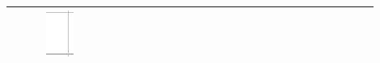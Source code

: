 \documentclass[10pt]{article}
\begin{document}
\begin{center}
\begin{tabular}{|c|c|c|c|c|c|c|c|c|c|c|c|c|c|c|c|c|c|c|c|c|c|c|c|c|c|c|c|c|c|}
 &  &  & \includegraphics[max width=\textwidth]{2024_11_21_94f02db55673a8a7b820g-12(3)}
 &  \\
\hline

\end{tabular}
\end{center}
\end{document}
